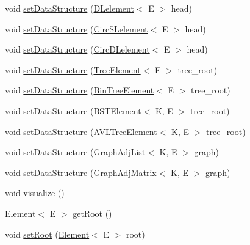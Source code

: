 \begin{DoxyCompactItemize}
\item 
void \hyperlink{classbridges_1_1connect_1_1_bridges_a383877f85bb048d47560e76f359e1bda}{set\+Data\+Structure} (\hyperlink{classbridges_1_1base_1_1_d_lelement}{D\+Lelement}$<$ E $>$ head)
\item 
void \hyperlink{classbridges_1_1connect_1_1_bridges_a285a7af5ad0594d4eeca51277e627c89}{set\+Data\+Structure} (\hyperlink{classbridges_1_1base_1_1_circ_s_lelement}{Circ\+S\+Lelement}$<$ E $>$ head)
\item 
void \hyperlink{classbridges_1_1connect_1_1_bridges_a4e5809b18d15854b54509f9d434a4fd7}{set\+Data\+Structure} (\hyperlink{classbridges_1_1base_1_1_circ_d_lelement}{Circ\+D\+Lelement}$<$ E $>$ head)
\item 
void \hyperlink{classbridges_1_1connect_1_1_bridges_a0788905a16b9a8f3deb0b4a344f2b42d}{set\+Data\+Structure} (\hyperlink{classbridges_1_1base_1_1_tree_element}{Tree\+Element}$<$ E $>$ tree\+\_\+root)
\item 
void \hyperlink{classbridges_1_1connect_1_1_bridges_a02a3d74b381473b5d97a8f8194df9b40}{set\+Data\+Structure} (\hyperlink{classbridges_1_1base_1_1_bin_tree_element}{Bin\+Tree\+Element}$<$ E $>$ tree\+\_\+root)
\item 
void \hyperlink{classbridges_1_1connect_1_1_bridges_adb01a9385de48ef267bdfd22758fb361}{set\+Data\+Structure} (\hyperlink{classbridges_1_1base_1_1_b_s_t_element}{B\+S\+T\+Element}$<$ K, E $>$ tree\+\_\+root)
\item 
void \hyperlink{classbridges_1_1connect_1_1_bridges_a702c3f88840e100ad0182110627e60f5}{set\+Data\+Structure} (\hyperlink{classbridges_1_1base_1_1_a_v_l_tree_element}{A\+V\+L\+Tree\+Element}$<$ K, E $>$ tree\+\_\+root)
\item 
void \hyperlink{classbridges_1_1connect_1_1_bridges_aa5dc1d094955a486e649fdb05d66502f}{set\+Data\+Structure} (\hyperlink{classbridges_1_1base_1_1_graph_adj_list}{Graph\+Adj\+List}$<$ K, E $>$ graph)
\item 
void \hyperlink{classbridges_1_1connect_1_1_bridges_a1ac1f8a7c5e95500712c2edaa5e8971f}{set\+Data\+Structure} (\hyperlink{classbridges_1_1base_1_1_graph_adj_matrix}{Graph\+Adj\+Matrix}$<$ K, E $>$ graph)
\item 
void \hyperlink{classbridges_1_1connect_1_1_bridges_a6881ed6e3f3a1db1d3cda249eb8543a1}{visualize} ()
\item 
\hyperlink{classbridges_1_1base_1_1_element}{Element}$<$ E $>$ \hyperlink{classbridges_1_1connect_1_1_bridges_ad46be93cba155fa93fd9082d9d813466}{get\+Root} ()
\item 
void \hyperlink{classbridges_1_1connect_1_1_bridges_aa05295718a1fefa2917dbaf874c79415}{set\+Root} (\hyperlink{classbridges_1_1base_1_1_element}{Element}$<$ E $>$ root)
\end{DoxyCompactItemize}
